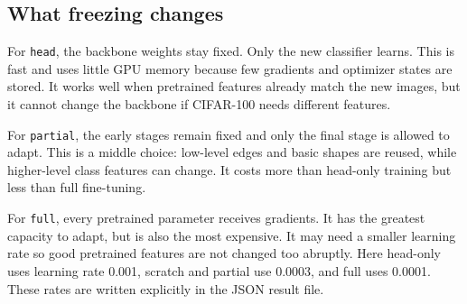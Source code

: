\documentclass[oneside]{hcmut-report}
\begin{document}
\subsection{What freezing changes}
For \texttt{head}, the backbone weights stay fixed. Only the new classifier learns. This is fast and uses little GPU memory because few gradients and optimizer states are stored. It works well when pretrained features already match the new images, but it cannot change the backbone if CIFAR-100 needs different features.

For \texttt{partial}, the early stages remain fixed and only the final stage is allowed to adapt. This is a middle choice: low-level edges and basic shapes are reused, while higher-level class features can change. It costs more than head-only training but less than full fine-tuning.

For \texttt{full}, every pretrained parameter receives gradients. It has the greatest capacity to adapt, but is also the most expensive. It may need a smaller learning rate so good pretrained features are not changed too abruptly. Here head-only uses learning rate 0.001, scratch and partial use 0.0003, and full uses 0.0001. These rates are written explicitly in the JSON result file.
\end{document}
